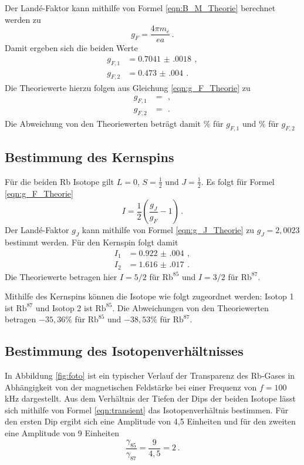 Der Landé-Faktor kann mithilfe von Formel \ref{eqn:B_M_Theorie} berechnet werden zu
\begin{equation*}
  g_F=\frac{4\pi m_e}{e a} \,.
\end{equation*}
Damit ergeben sich die beiden Werte
\begin{align*}
  g_{F,1}&= \SI{0.7041(0018)}{}\,,\\
  g_{F,2}&= \SI{0.473(004)}{}\,.
\end{align*}
Die Theoriewerte hierzu folgen aus Gleichung \eqref{eqn:g_F_Theorie} zu
\begin{align*}
  g_{F,1}&= \SI{}{}\,,\\
  g_{F,2}&= \SI{}{}\,.
\end{align*}
Die Abweichung von den Theoriewerten beträgt damit $\%$ für $g_{F,1}$ und
 $\%$ für $g_{F,2}$

\subsection{Bestimmung des Kernspins}
\label{subsec:Kernspin}

Für die beiden Rb Isotope gilt $L=0$, $S=\frac{1}{2}$ und $J=\frac{1}{2}$.
Es folgt für Formel \eqref{eqn:g_F_Theorie}
\begin{equation*}
  I=\frac{1}{2}\left(\frac{g_J}{g_F}-1\right) \,.
\end{equation*}
Der Landé-Faktor $g_J$ kann mithilfe von Formel \ref{eqn:g_J_Theorie} zu $g_J=2{,}0023$ bestimmt
werden. Für den Kernspin folgt damit
\begin{align*}
  I_1&= \SI{0.922(004)}{}\,,\\
  I_2&= \SI{1.616(017)}{}\,.
\end{align*}
Die Theoriewerte betragen hier $I=5/2$ für $\text{Rb}^{85}$ und $I=3/2$ für $\text{Rb}^{87}$.

Mithilfe des Kernspins können die Isotope wie folgt zugeordnet werden: Isotop 1 ist $\text{Rb}^{87}$
und Isotop 2 ist $\text{Rb}^{85}$. Die Abweichungen von den Theoriewerten betragen
$-35{,}36\%$ für $\text{Rb}^{85}$ und $-38{,}53\%$ für $\text{Rb}^{87}$.


\subsection{Bestimmung des Isotopenverhältnisses}
\label{subsec:Isotope}
In Abbildung \ref{fig:foto} ist ein typischer Verlauf der Transparenz des Rb-Gases in Abhängigkeit
von der magnetischen Feldstärke bei einer Frequenz von $f=100\,$kHz dargestellt.
Aus dem Verhältnis der Tiefen der Dips der beiden
Isotope lässt sich mithilfe von Formel \ref{eqn:transient} das Isotopenverhältnis bestimmen.
Für den ersten Dip ergibt sich eine Amplitude von 4{,}5 Einheiten und für den zweiten
eine Amplitude von 9 Einheiten
\begin{equation}
  \frac{\gamma_{85}}{\gamma_{87}}=\frac{9}{4{,}5}= 2 \,.
\end{equation}


